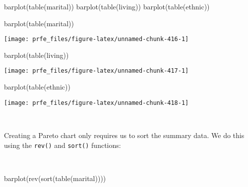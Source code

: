 \documentclass[
  12pt,
  a4paper]{book}
\newenvironment{Shaded}{\begin{snugshade}}{\end{snugshade}}
\newcommand{\FunctionTok}[1]{\textcolor[rgb]{0.00,0.00,0.00}{#1}}
\newcommand{\NormalTok}[1]{#1}
\begin{document}
\begin{Shaded}
\begin{Highlighting}[]
\FunctionTok{barplot}\NormalTok{(}\FunctionTok{table}\NormalTok{(marital))}
\FunctionTok{barplot}\NormalTok{(}\FunctionTok{table}\NormalTok{(living))}
\FunctionTok{barplot}\NormalTok{(}\FunctionTok{table}\NormalTok{(ethnic))}
\end{Highlighting}
\end{Shaded}

\newpage

\begin{Shaded}
\begin{Highlighting}[]
\FunctionTok{barplot}\NormalTok{(}\FunctionTok{table}\NormalTok{(marital))}
\end{Highlighting}
\end{Shaded}

\begin{center}\texttt{[image: prfe\_files/figure-latex/unnamed-chunk-416-1]} \end{center}

\begin{Shaded}
\begin{Highlighting}[]
\FunctionTok{barplot}\NormalTok{(}\FunctionTok{table}\NormalTok{(living))}
\end{Highlighting}
\end{Shaded}

\begin{center}\texttt{[image: prfe\_files/figure-latex/unnamed-chunk-417-1]} \end{center}

\newpage

\begin{Shaded}
\begin{Highlighting}[]
\FunctionTok{barplot}\NormalTok{(}\FunctionTok{table}\NormalTok{(ethnic))}
\end{Highlighting}
\end{Shaded}

\begin{center}\texttt{[image: prfe\_files/figure-latex/unnamed-chunk-418-1]} \end{center}

~

Creating a Pareto chart only requires us to sort the summary data. We do this using the \texttt{rev()} and \texttt{sort()} functions:

~

\begin{Shaded}
\begin{Highlighting}[]
\FunctionTok{barplot}\NormalTok{(}\FunctionTok{rev}\NormalTok{(}\FunctionTok{sort}\NormalTok{(}\FunctionTok{table}\NormalTok{(marital))))}
\end{Highlighting}
\end{Shaded}
\end{document}
